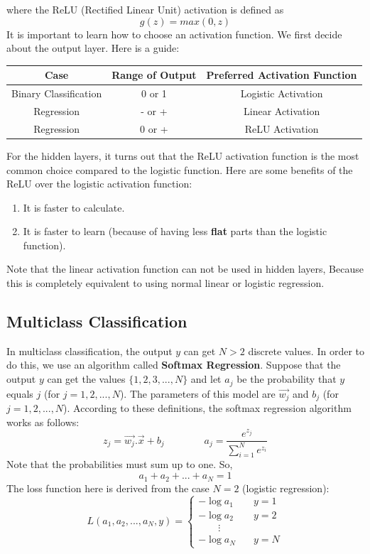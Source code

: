 \documentclass[a4paper, 12pt]{book}
\begin{document}
\noindent where the ReLU (Rectified Linear Unit) activation is defined as \[g(z) = max(0,z)\]
It is important to learn how to choose an activation function. We first decide about the output layer. Here is a guide:
\begin{center}
    \begin{tabular}{|c|c|c|}
        \hline
        Case & Range of Output & Preferred Activation Function\\
        \hline \hline
        Binary Classification & 0 or 1 & Logistic Activation \\
        \hline
        Regression & - or + & Linear Activation \\
        \hline
        Regression & 0 or + & ReLU Activation \\
        \hline
    \end{tabular}
\end{center}
For the hidden layers, it turns out that the ReLU activation function is the most common choice compared to the logistic function. Here are some benefits of the ReLU over the logistic activation function:
\begin{enumerate}
    \item It is faster to calculate.
    \item It is faster to learn (because of having less \textbf{flat} parts than the logistic function).
\end{enumerate}
Note that the linear activation function can not be used in hidden layers, Because this is completely equivalent to using normal linear or logistic regression.

\subsection{Multiclass Classification}
In multiclass classification, the output $y$ can get $N > 2$ discrete values. In order to do this, we use an algorithm called \textbf{Softmax Regression}. Suppose that the output $y$ can get the values $\{1,2,3,...,N\}$ and let $a_j$ be the probability that $y$ equals $j$ (for $j = 1,2,...,N$). The parameters of this model are $\Vec{w_j}$ and $b_j$ (for $j = 1,2,...,N$). According to these definitions, the softmax regression algorithm works as follows:
\[z_j = \Vec{w_j}.\Vec{x} + b_j \qquad \qquad a_j = \frac{e^{z_j}}{\sum_{i=1}^{N} e^{z_i}}\]
Note that the probabilities must sum up to one. So, \[a_1 + a_2 + ... + a_N = 1\]
The loss function here is derived from the case $N = 2$ (logistic regression):
\[ L(a_1,a_2,...,a_N,y) =
\begin{cases}
    -\log a_1 &\quad y = 1 \\
    -\log a_2 &\quad y = 2 \\
    \qquad \vdots & \\
    -\log a_N &\quad y = N
\end{cases}
\]
\end{document}
